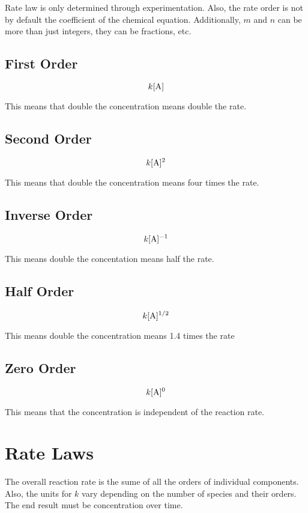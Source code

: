 \documentclass{article}
\begin{document}
Rate law is only determined through experimentation. Also, the rate order is not
by default the coefficient of the chemical equation. Additionally, $m$ and $n$
can be more than just integers, they can be fractions, etc. 

\subsection{ First Order }

$$ k[ \ce{ A } ] $$

This means that double the concentration means double the rate.

\subsection{ Second Order }

$$ k[ \ce{ A } ]^{2} $$

This means that double the concentration means four times the rate.

\subsection{ Inverse Order }

$$ k[ \ce{ A } ]^{-1} $$

This means double the concentation means half the rate.

\subsection{ Half Order }

$$ k[ \ce{ A } ]^{1/2} $$

This means double the concentration means 1.4 times the rate

\subsection{ Zero Order}

$$ k[ \ce{ A } ]^{0} $$

This means that the concentration is independent of the reaction rate.

\section{ Rate Laws }

The overall reaction rate is the sume of all the orders of individual
components. Also, the units for $k$ vary depending on the number of species and
their orders. The end result must be concentration over time.
\end{document}
